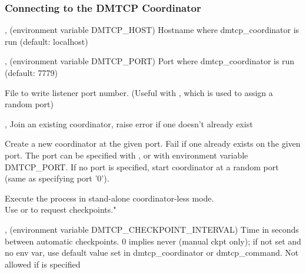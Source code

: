 \subsubsection{Connecting to the DMTCP Coordinator}
\begin{Description}
  \item[\Opt{-h}, \Opt{--host} \Arg{hostname} (environment variable DMTCP_HOST)]
    Hostname where dmtcp_coordinator is run (default: localhost)

  \item[\Opt{-p}, \Opt{--port} \Arg{port} (environment variable DMTCP_PORT)]
    Port where dmtcp_coordinator is run (default: 7779)

  \item[\OptSArg{--port-file}{filename}]
    File to write listener port number.
    (Useful with , which is used to assign a random port)

  \item[\Opt{-j}, \Opt{--join}]
    Join an existing coordinator, raise error if one doesn't
    already exist

  \item[\Opt{--new-coordinator}]
    Create a new coordinator at the given port. Fail if one
    already exists on the given port. The port can be specified
    with , or with environment variable DMTCP_PORT.  If no
    port is specified, start coordinator at a random port (same
    as specifying port '0').

  \item[\Opt{--no-coordinator}]
    Execute the process in stand-alone coordinator-less mode.\\
    Use  or  to request checkpoints.\n"

  \item[\Opt{-i}, \Opt{-interval} \Arg{seconds} (environment variable DMTCP_CHECKPOINT_INTERVAL)]
    Time in seconds between automatic checkpoints.
    0 implies never (manual ckpt only); if not set and no env var,
    use default value set in dmtcp_coordinator or dmtcp_command.
    Not allowed if  is specified
\end{Description}

